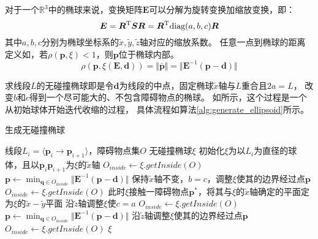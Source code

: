 对于一个$\mathbb{R}^3$中的椭球来说，变换矩阵$\bm{E}$可以分解为旋转变换加缩放变换，即：
\begin{equation}
  \bm{E} = {\bm{R}}^{\text{T}}\bm{S}\bm{R} = {\bm{R}}^{\text{T}}\text{diag}(a, b, c)\bm{R}
  \label{equ:decomp_E}
\end{equation}
其中$a, b, c$分别为椭球坐标系的$\tilde{x}, \tilde{y}, \tilde{z}$轴对应的缩放系数。
任意一点到椭球的距离定义如，若$\rho(\bm{p}, \xi) < 1$，则$\bm{p}$位于椭球内部。
\begin{equation}
  \rho(\bm{p}, \xi(\bm{E}, \bm{d})) = \Vert \bar{\bm{p}} \Vert = 
  \Vert \bm{E}^{-1}(\bm{p} - \bm{d}) \Vert
  \label{equ:distance_to_ellipsoids}
\end{equation}

求线段$L$的无碰撞椭球即是令$\bm{d}$为线段的中点，固定椭球$\tilde{x}$轴与$L$重合且$2a=L$，
改变$b$和$c$得到一个尽可能大的、不包含障碍物点的椭球。
如所示，这个过程是一个从初始球体开始迭代收缩的过程，
具体流程如算法\ref{alg:generate_ellipsoid}所示。

\begin{algorithm}[h]
      \wuhao
      \caption{生成无碰撞椭球\label{alg:generate_ellipsoid}}  
      \begin{algorithmic}[1] %
          \REQUIRE 线段$L_{i}= \langle \bm{p}_{i} \rightarrow \bm{p}_{i+1} \rangle $，障碍物点集$O$
          \ENSURE 无碰撞椭球$\xi$
          \STATE 初始化$\xi$为以$L_{i}$为直径的球体，且以$\bm{p}_{i}\bm{p}_{i+1}$为$\xi$的$\widetilde{x}$轴
          \STATE  $O_{inside}\gets \xi.getInside(O)$
            \STATE $\bm{p}\gets \min_{\bm{q} \in O_{inside}}\Vert \bm{E}^{-1}(\bm{p}-\bm{d}) \Vert$
            \STATE 保持$\widetilde{x}$轴不变，$b=c$，调整$\xi$使其的边界经过点$\bm{p}$
            \STATE $O_{inside}\gets \xi.getInside(O)$
          \ENDWHILE
          \STATE 此时$\xi$接触一障碍物点$\bm{p}^{*}$，将其与$\xi$的$\widetilde{x}$轴确定的平面定为$\xi$的$\widetilde{x}-\widetilde{y}$平面
          \STATE 沿$\widetilde{z}$轴调整$\xi$使$c=a$
          \STATE  $O_{inside}\gets \xi.getInside(O)$
            \STATE $\bm{p}\gets \min_{\bm{q} \in O_{inside}}\Vert \bm{E}^{-1}(\bm{p}-\bm{d}) \Vert$
            \STATE 沿$\widetilde{z}$轴调整$\xi$使其的边界经过点$\bm{p}$
            \STATE $O_{inside}\gets \xi.getInside(O)$
          \ENDWHILE
          \RETURN $\xi$
      \end{algorithmic}  
\end{algorithm} 

